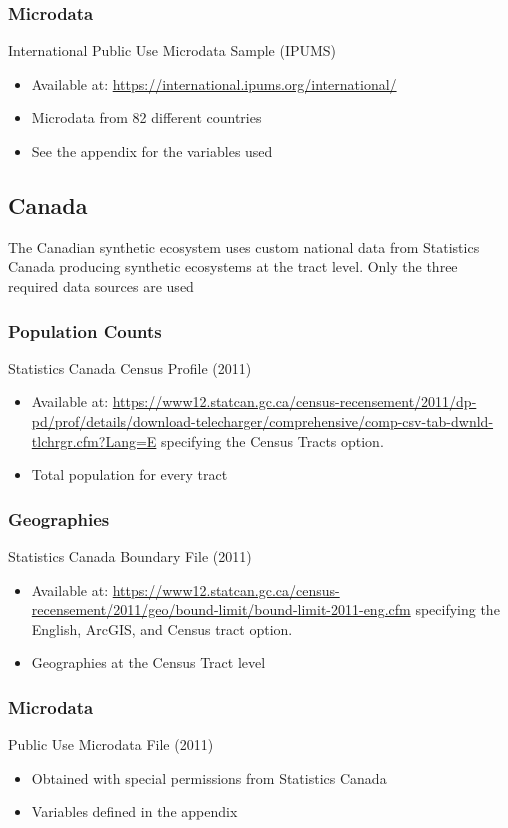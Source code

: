 \documentclass[font=9pt]{article}
\begin{document}
\subsubsection{Microdata} \cite{ipumsi}
International Public Use Microdata Sample (IPUMS)
\begin{itemize}			
	\item Available at: \url{https://international.ipums.org/international/}
	\item Microdata from 82 different countries 
	\item See the appendix for the variables used 
\end{itemize}

\subsection{Canada}	
The Canadian synthetic ecosystem uses custom national data from Statistics Canada producing synthetic ecosystems at the tract level. Only the three required data sources are used

\subsubsection{Population Counts}
Statistics Canada Census Profile (2011)
\begin{itemize}
	\item Available at: \url{https://www12.statcan.gc.ca/census-recensement/2011/dp-pd/prof/details/download-telecharger/comprehensive/comp-csv-tab-dwnld-tlchrgr.cfm?Lang=E} specifying the Census Tracts option.
	\item Total population for every tract 
\end{itemize}

\subsubsection{Geographies}
Statistics Canada Boundary File (2011)
\begin{itemize}
	\item Available at: \url{https://www12.statcan.gc.ca/census-recensement/2011/geo/bound-limit/bound-limit-2011-eng.cfm} specifying the English, ArcGIS, and Census tract option.
	\item Geographies at the Census Tract level 
\end{itemize}

\subsubsection{Microdata}
Public Use Microdata File (2011) \cite{statcan}
\begin{itemize}
	\item Obtained with special permissions from Statistics Canada
	\item Variables defined in the appendix
\end{itemize}
\end{document}
